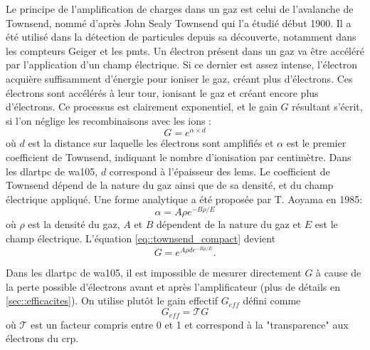       Le principe de l'amplification de charges dans un gaz est celui de l'avalanche de Townsend, nommé d'après John Sealy Townsend qui l'a étudié début 1900\cite{Townsend1910}. Il a été utilisé dans la détection de particules depuis sa découverte, notamment dans les compteurs Geiger et les \glspl{pmt}. Un électron présent dans un gaz va être accéléré par l'application d'un champ électrique. Si ce dernier est assez intense, l'électron acquière suffisamment d'énergie pour ioniser le gaz, créant plus d'électrons. Ces électrons sont accélérés à leur tour, ionisant le gaz et créant encore plus d'électrons. Ce processus est clairement exponentiel, et le gain $G$ résultant s'écrit, si l'on néglige les recombinaisons avec les ions :
      \begin{equation}\label{eq::townsend_compact}
        G = e^{\alpha\times d}
      \end{equation}
      où $d$ est la distance sur laquelle les électrons sont amplifiés et $\alpha$ est le premier coefficient de Townsend, indiquant le nombre d'ionisation par centimètre. Dans les \gls{dlartpc} de \gls{wa105}, $d$ correspond à l'épaisseur des \glspl{lem}. Le coefficient de Townsend dépend de la nature du gaz ainsi que de sa densité, et du champ électrique appliqué. Une forme analytique a été proposée par T. Aoyama en 1985\cite{Aoyama1985}:
      \begin{equation}\label{eq::townsend_coef}
        \alpha = A\rho e^{-B\rho/E}
      \end{equation}
      où $\rho$ est la densité du gaz, $A$ et $B$ dépendent de la nature du gaz et $E$ est le champ électrique. L'équation \eqref{eq::townsend_compact} devient
      \begin{equation}\label{eq::townsend}
        G = e^{A\rho  de^{-B\rho /E}}.
      \end{equation}

      Dans les \gls{dlartpc} de \gls{wa105}, il est impossible de mesurer directement $G$ à cause de la perte possible d'électrons avant et après l'amplificateur (plus de détails en \autoref{sec::efficacites}). On utilise plutôt le gain effectif $G_{eff}$ défini comme
      \begin{equation}\label{eq::gain_eff}
        G _{eff}= \mathcal{T}G
      \end{equation}
      où $\mathcal{T}$ est un facteur compris entre 0 et 1 et correspond à la "transparence" aux électrons du \gls{crp}. 

